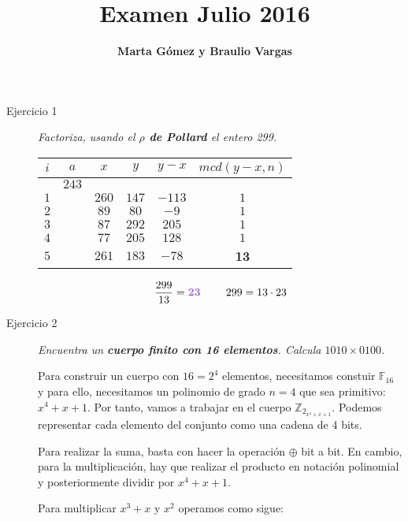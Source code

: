 \documentclass[10pt,spanish]{article}
\title{\fontfamily{pag}\selectfont \bfseries \Huge \color{morado} Examen Julio 2016}
\author{\fontfamily{pag}\selectfont \bfseries \LARGE Marta Gómez y Braulio Vargas}
\begin{document}
\maketitle

\renewcommand{\tablename}{Tabla}

\begin{description}
    \item[Ejercicio 1] \textit{Factoriza, usando el \textbf{\textcolor{morado}{$\rho$ de Pollard}} el entero 299.}

    \begin{center}
    \begin{tabular}{c | c | c | c | c | c}
    $i$ & $a$ & $x$ & $y$ & $y-x$ & $mcd (y-x,n)$ \\
    \hline
    & $243$ & & & & \\
    $1$ & & $260$ & $147$ & $-113$ & $1$ \\
    $2$ & & $89$ & $80$ & $-9$ & $1$ \\
    $3$ & & $87$ & $292$ & $205$ & $1$ \\
    $4$ & & $77$ & $205$ & $128$ & $1$ \\
    $5$ & & $261$ & $183$ & $-78$ & \textbf{\textcolor{morado}{13}}
    \end{tabular}
    \end{center}

    \begin{displaymath}
        \frac{299}{13} = \mathbf{\textcolor{morado}{23}} \qquad\ 299 = 13 \cdot 23
    \end{displaymath}

    \item[Ejercicio 2] \textit{Encuentra un \textbf{\textcolor{morado}{cuerpo finito con 16 elementos}}. Calcula $1010 \times 0100$.}

    Para construir un cuerpo con $16 = 2^4$ elementos, necesitamos constuir $\mathbb{F}_{16}$ y para ello, necesitamos un polinomio de grado $n = 4$ que sea primitivo: $x^4 + x + 1$. Por tanto, vamos a trabajar en el cuerpo $\mathbb{Z}_{2_{x^4 + x + 1}}$. Podemos representar cada elemento del conjunto como una cadena de 4 bits.

    Para realizar la suma, basta con hacer la operación $\oplus$ bit a bit. En cambio, para la multiplicación, hay que realizar el producto en notación polinomial y posteriormente dividir por $x^4 + x + 1$.

    Para multiplicar $x^3 + x$ y $x^2$ operamos como sigue:


\end{description}
\end{document}
